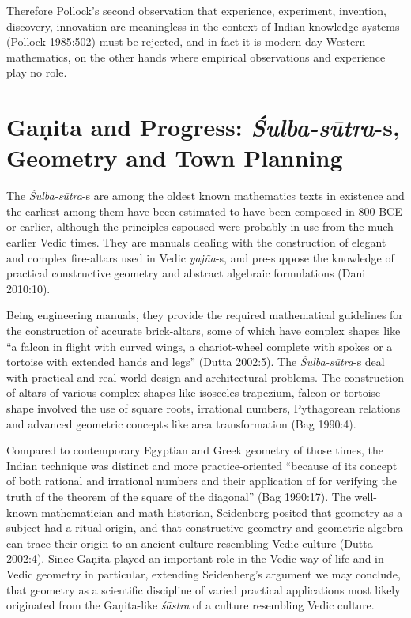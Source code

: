 Therefore Pollock's second observation that experience, experiment, invention, discovery, innovation are meaningless in the context of Indian knowledge systems (Pollock 1985:502) must be rejected, and in fact it is modern day Western mathematics, on the other hands where empirical observations and experience play no role.

\section*{Gaṇita and Progress: {\sl\bfseries Śulba-sūtra}-s, Geometry and Town Planning}

The {\sl Śulba-sūtra}-s are among the oldest known mathematics texts in existence and the earliest among them have been estimated to have been composed in 800 BCE or earlier, although the principles espoused were probably in use from the much earlier Vedic times. They are manuals dealing with the construction of elegant and complex fire-altars used in Vedic {\sl yajña}-s, and pre-suppose the knowledge of practical constructive geometry and abstract algebraic formulations (Dani 2010:10). 

Being engineering manuals, they provide the required mathematical guidelines for the construction of accurate brick-altars, some of which have complex shapes like ``a falcon in flight with curved wings, a chariot-wheel complete with spokes or a tortoise with extended hands and legs'' (Dutta 2002:5). The {\sl Śulba-sūtra}-s deal with practical and real-world design and architectural problems. The construction of altars of various complex shapes like isosceles trapezium, falcon or tortoise shape involved the use of square roots, irrational numbers, Pythagorean relations and advanced geometric concepts like area transformation (Bag 1990:4).

Compared to contemporary Egyptian and Greek geometry of those times, the Indian technique was distinct and more practice-oriented ``because of its concept of both rational and irrational numbers and their application of for verifying the truth of the theorem of the square of the diagonal'' (Bag 1990:17). The well-known mathematician and math historian, Seidenberg posited that geometry as a subject had a ritual origin, and that constructive geometry and geometric algebra can trace their origin to an ancient culture resembling Vedic culture (Dutta 2002:4). Since Gaṇita played an important role in the Vedic way of life and in Vedic geometry in particular, extending Seidenberg’s argument we may conclude, that geometry as a scientific discipline of varied practical applications most likely originated from the Gaṇita-like {\sl śāstra} of a culture resembling Vedic culture.

